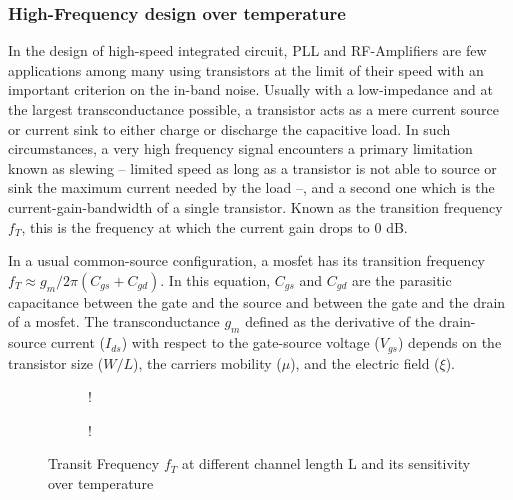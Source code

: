 \subsubsection{High-Frequency design over temperature}
\label{sec:des_speed}
In the design of high-speed integrated circuit, PLL and RF-Amplifiers are few applications among many using transistors at the limit of their speed with an important criterion on the in-band noise. Usually with a low-impedance and at the largest transconductance possible, a transistor acts as a mere current source or current sink to either charge or discharge the capacitive load. In such circumstances, a very high frequency signal encounters a primary limitation known as slewing -- limited speed as long as a transistor is not able to source or sink the maximum current needed by the load --, and a second one which is the current-gain-bandwidth of a single transistor. Known as the transition frequency \(f_T \), this is the frequency at which the current gain drops to 0 dB.

In a usual common-source configuration, a mosfet has its transition frequency \(f_T \approx g_m/2\pi (C_{gs}+C_{gd})\). In this equation, \(C_{gs} \) and  \(C_{gd} \) are the parasitic capacitance between the gate and the source and between the gate and the drain of a mosfet. The transconductance \(g_m \) defined as the derivative of the drain-source current (\(I_{ds} \)) with respect to the gate-source voltage (\(V_{gs}\)) depends on the transistor size (\(W/L\)), the carriers mobility (\(\mu \)), and the electric field (\(\xi \)).

\begin{figure}[!ht]
    \centering
    \begin{subfigure}[b]{0.48\textwidth}
        \resizebox {\textwidth} {!} { 
            
        }
    \end{subfigure}
    \begin{subfigure}[b]{0.48\textwidth}
        \resizebox {\textwidth} {!} { 
            
        }
        \label{fig:ft_nel_sensitivity}
    \end{subfigure}
    \caption{Transit Frequency \(f_T\) at different channel length L and its sensitivity over temperature}
    \label{fig:ft_nel}
\end{figure}

